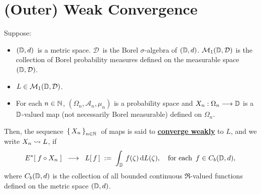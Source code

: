 

\section{(Outer) Weak Convergence}
\setcounter{theorem}{0}
\setcounter{equation}{0}


\renewcommand{\theenumi}{\roman{enumi}}
\renewcommand{\labelenumi}{\textnormal{(\theenumi)}$\;\;$}


\begin{definition}
\mbox{}
\vskip -0.3cm
\noindent
Suppose:
\begin{itemize}
\item
	$(\mathbb{D},d)$\, is a metric space.
	$\mathcal{D}$\, is the Borel $\sigma$-algebra of $(\mathbb{D},d)$.
	\vskip 0.0cm
	$\mathcal{M}_{1}(\mathbb{D},\mathcal{D})$ is the collection of Borel probability measures
	defined on the measurable space $(\mathbb{D},\mathcal{D})$.
\item
	$L \in \mathcal{M}_{1}(\mathbb{D},\mathcal{D})$.
\item
	For each $n \in \mathbb{N}$,
	$(\Omega_{n},\mathcal{A}_{n},\mu_{n})$ is a probability space and
	$X_{n} : \Omega_{n} \longrightarrow \mathbb{D}$
	is a $\mathbb{D}$-valued map (not necessarily Borel measurable) defined on $\Omega_{n}$.
\end{itemize}
Then, the sequence \,$\left\{\,X_{n}\,\right\}_{n\in\mathbb{N}}$\, of maps is said to
\underline{\textbf{converge weakly}} to $L$, and we write $X_{n} \rightsquigarrow L$, if
\begin{equation*}
E^{*}\!\left[\; f \circ X_{n} \;\right]
\;\; \longrightarrow \;\;
	L\!\left[\,f\,\right] \; := \; \int_{\mathbb{D}}\, f(\zeta)\, \textnormal{d} L(\zeta),
	\quad
	\textnormal{for each \,$f \in C_{b}(\mathbb{D},d)$},
\end{equation*}
where $C_{b}(\mathbb{D},d)$ is the collection of all bounded continuous $\Re$-valued
functions defined on the metric space $(\mathbb{D},d)$.
\end{definition}


